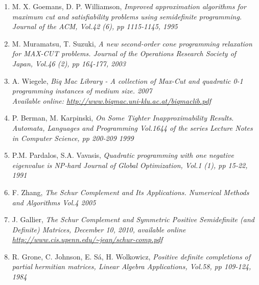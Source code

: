 \documentclass[12pt]{book}
\theoremstyle{definition}
\begin{document}
\begin{enumerate}


\item M. X. Goemans, D. P. Williamson, \it Improved approximation algorithms for maximum cut and satisfiability problems using semidefinite programming. \rm Journal of the ACM, Vol.42 (6), pp 1115-1145, 1995
\label{GoemansWilliamsonMaxCut}
%
\item M. Muramatsu,  T. Suzuki, \it A new second-order cone programming relaxation for MAX-CUT problems. \rm Journal of the Operations Research
Society of Japan, Vol.46 (2), pp 164-177, 2003
\label{MuramatsuSuzukiANewSOCPrelaxForMaxCut}
%
\item A. Wiegele, \it Biq Mac Library - A collection of Max-Cut and
quadratic 0-1 programming instances of medium size. \rm 2007 \\
Available online: \url{http://www.biqmac.uni-klu.ac.at/biqmaclib.pdf}
\label{BiqMacLib}

	








%
\item P. Berman, M. Karpinski, \it On Some Tighter Inapproximability Results. \rm Automata, Languages and Programming
Vol.1644 of the series Lecture Notes in Computer Science, pp 200-209 1999
\label{Inapproximability results}
%
\item P.M. Pardalos, S.A. Vavasis, \it Quadratic programming with one negative eigenvalue is NP-hard \rm Journal of Global Optimization, Vol.1 (1), pp 15-22, 1991
\label{PardalosQPisNPHard}
%
\item F. Zhang, \it The Schur Complement and Its Applications. \rm
Numerical Methods and Algorithms Vol.4 2005
\label{ZhangSchurComplement}
%
\item J. Gallier, \it The Schur Complement and Symmetric Positive Semidefinite (and Definite) Matrices, \rm December 10, 2010, available online \url{http://www.cis.upenn.edu/~jean/schur-comp.pdf}
\label{GallierSchurCompl}
%
\item R. Grone, C. Johnson, E. Sá, H. Wolkowicz, \it Positive definite completions of partial hermitian matrices, \rm 
Linear Algebra Applications, Vol.58, pp 109-124, 1984
\label{GronePSDcompletions}
%


\end{enumerate}
\end{document}
